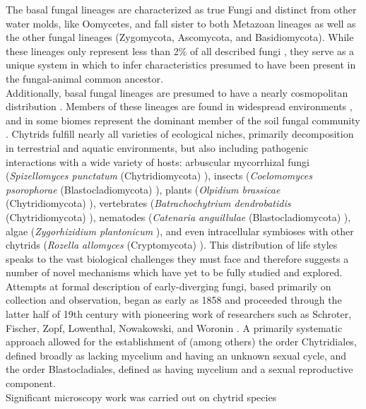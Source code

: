 \indent The basal fungal lineages are characterized as true Fungi 
and distinct from other water molds, like Oomycetes, and fall sister 
to both Metazoan lineages as well as the other fungal lineages 
(Zygomycota, Ascomycota, and Basidiomycota). While these lineages 
only represent less than 2\% of all described fungi \cite{Stajich2009}, 
they serve as a unique system in which to infer characteristics presumed 
to have been present in the fungal-animal common ancestor.\\
\indent Additionally, basal fungal lineages are presumed to have a nearly 
cosmopolitan distribution \cite{Powell1993}. Members of these lineages 
are found in widespread environments \cite{Tedersoo2014}, and in some
biomes represent the dominant member of the soil fungal community 
\cite{Freeman2009}. Chytrids fulfill nearly all varieties of ecological niches, primarily 
decomposition in terrestrial and aquatic environments, but also including 
pathogenic interactions with a wide variety of hosts: arbuscular mycorrhizal 
fungi (\textit{Spizellomyces punctatum} (Chytridiomycota) \cite{Paulitz1984}), 
insects (\textit{Coelomomyces psorophorae} (Blastocladiomycota) \cite{Zebold1979}), 
plants (\textit{Olpidium brassicae} (Chytridiomycota) \cite{Tewari1983}), 
vertebrates (\textit{Batrachochytrium dendrobatidis} (Chytridiomycota) \cite{Longcore1999}), 
nematodes (\textit{Catenaria anguillulae} (Blastocladiomycota) \cite{Deacon1997}), 
algae (\textit{Zygorhizidium plantonicum} \cite{Canter1967}), and even intracellular 
symbioses with other chytrids (\textit{Rozella allomyces} (Cryptomycota) \cite{Held1973}). 
This distribution of life styles speaks to the vast biological 
challenges they must face and therefore suggests a number of novel 
mechanisms which have yet to be fully studied and explored. \\
\indent Attempts at formal description of early-diverging fungi, 
based primarily on collection and observation, began as early as 
1858 and proceeded through the latter half of 19th century with 
pioneering work of researchers such as Schroter, Fischer, Zopf, 
Lowenthal, Nowakowski, and Woronin \cite{Fitzpatrick1930}. 
A primarily systematic approach allowed for the establishment of 
(among others) the order Chytridiales, defined broadly as lacking 
mycelium and having an unknown sexual cycle, and the order Blastocladiales, 
defined as having mycelium and a sexual reproductive component.\\
\indent Significant microscopy work was carried out on chytrid species
